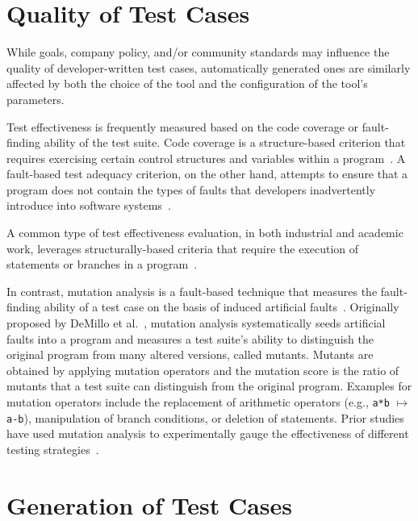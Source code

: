 
\section{Quality of Test Cases}

While goals, company policy, and/or community standards may influence the
quality of developer-written test cases, automatically generated ones are
similarly affected by both the choice of the tool and the configuration of the
tool's parameters. 

Test effectiveness is frequently measured based on the code coverage or
fault-finding ability of the test suite.  Code coverage is a structure-based
criterion that requires exercising certain control structures and variables
within a program~\cite{kapfhammer-testing-handbook}. A fault-based test adequacy
criterion, on the other hand, attempts to ensure that a program does not contain
the types of faults that developers inadvertently introduce into software
systems~\cite{demillo1978hints}.  

A common type of test effectiveness evaluation, in both industrial and academic
work, leverages structurally-based criteria that require the execution of
statements or branches in a program~\cite{weyuker1988evaluation}.

In contrast, mutation analysis is a fault-based technique that measures the
fault-finding ability of a test case on the basis of induced artificial
faults~\cite{demillo1978hints, hamlet1977testing}.  Originally proposed by
DeMillo et al.~\cite{demillo1978hints}, mutation analysis systematically seeds
artificial faults into a program and measures a test suite's ability to
distinguish the original program from many altered versions, called mutants.
Mutants are obtained by applying mutation operators and the mutation score is
the ratio of mutants that a test suite can distinguish from the original
program.  Examples for mutation operators include the replacement of arithmetic
operators (e.g., \verb|a*b| $\mapsto$ \verb|a-b|), manipulation of branch
conditions, or deletion of statements.  Prior studies have used mutation
analysis to experimentally gauge the effectiveness of different testing
strategies~\cite{andrews2005mutation,andrews2006,do2006,just2014}.  

\section{Generation of Test Cases} 
\label{sec:background}

